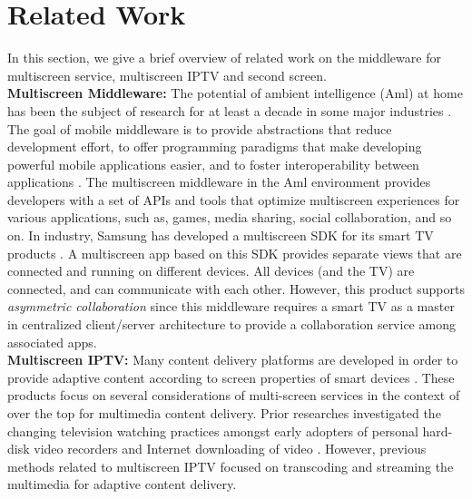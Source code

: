 \documentclass{sig-alternate}
\begin{document}
\section{Related Work}
\label{sc:RelatedWork}
In this section, we give a brief overview of related work on the middleware for multiscreen service, multiscreen IPTV and second screen.\\

\noindent
\textbf{Multiscreen Middleware:}
The potential of ambient intelligence (Aml) at home has been the subject of research for at least a decade in some major industries \cite{Aarts:2004, Sadri:2011}. 
The goal of mobile middleware is to provide abstractions that reduce development effort, to offer programming paradigms that make developing powerful mobile applications easier, and to foster interoperability between applications \cite{DBLP:SchmohlB08}.
The multiscreen middleware in the Aml environment provides developers with a set of APIs and tools that optimize multiscreen experiences for various applications, such as, games, media sharing, social collaboration, and so on.
In industry, Samsung has developed a multiscreen SDK for its smart TV products \cite{samsung:2014}.
A multiscreen app based on this SDK provides separate views that are connected and running on different devices. 
All devices (and the TV) are connected, and can communicate with each other.
However, this product supports  \textit{asymmetric collaboration} since this middleware requires a smart TV as a master in centralized client/server architecture to provide a collaboration service among associated apps.\\

\noindent
\textbf{Multiscreen IPTV:}  
Many content delivery platforms are developed in order to provide adaptive content according to screen properties of smart devices \cite{Lucent2011}. These products focus on several considerations of multi-screen services in the context of over the top for multimedia content delivery. 
Prior researches investigated the changing television watching practices amongst early adopters of personal hard-disk video recorders and Internet downloading of video \cite{Longo:2013}.
However, previous methods related to multiscreen IPTV focused on transcoding and streaming the multimedia for adaptive content delivery.\\ 
\end{document}
